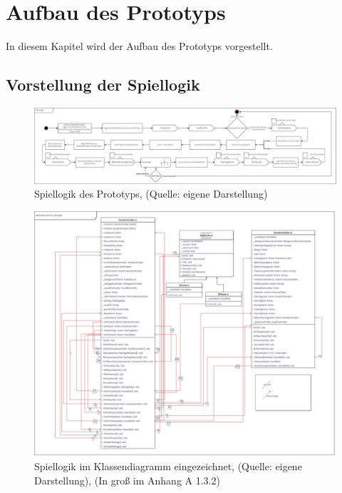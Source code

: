 \section{Aufbau des Prototyps}\label{sec:rework}
In diesem Kapitel wird der Aufbau des Prototyps vorgestellt. 

\subsection{Vorstellung der Spiellogik}\label{sec:main-game-loop}
\begin{figure}[ht]
\centering
\includegraphics[width=1\linewidth]{content/pictures/Game-Loop_Prototype.jpg}
\caption{Spiellogik des Prototyps, (Quelle: eigene Darstellung)}
\label{fig:main_game_loop}
\end{figure}

\begin{figure}[ht]
\centering
\includegraphics[width=1\linewidth]{content/pictures/Game-Loop-Class-Diagramm-Connectors.jpg}
\caption{Spiellogik im Klassendiagramm eingezeichnet, (Quelle: eigene Darstellung), (In groß im Anhang A 1.3.2)}
\label{fig:main_game_loop_class_connectors}
\end{figure}

